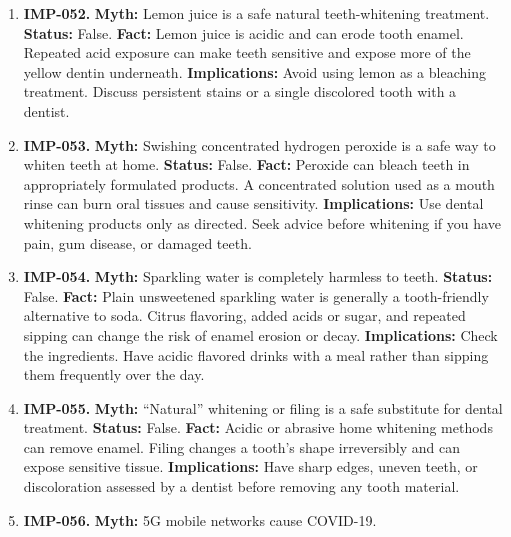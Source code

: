 \documentclass[11pt,oneside]{book}
\begin{document}
\begin{enumerate}[leftmargin=0pt,labelwidth=0pt,labelsep=0pt,itemindent=0pt]
\item[] \textbf{IMP-052.} \textbf{Myth:} Lemon juice is a safe natural teeth-whitening treatment.\newline
\textbf{Status:} False.\newline
\textbf{Fact:} Lemon juice is acidic and can erode tooth enamel. Repeated acid exposure can make teeth sensitive and expose more of the yellow dentin underneath. \cite{ref411}\newline
\textbf{Implications:} Avoid using lemon as a bleaching treatment. Discuss persistent stains or a single discolored tooth with a dentist.
\item[] \textbf{IMP-053.} \textbf{Myth:} Swishing concentrated hydrogen peroxide is a safe way to whiten teeth at home.\newline
\textbf{Status:} False.\newline
\textbf{Fact:} Peroxide can bleach teeth in appropriately formulated products. A concentrated solution used as a mouth rinse can burn oral tissues and cause sensitivity. \cite{ref411,ref50}\newline
\textbf{Implications:} Use dental whitening products only as directed. Seek advice before whitening if you have pain, gum disease, or damaged teeth.
\item[] \textbf{IMP-054.} \textbf{Myth:} Sparkling water is completely harmless to teeth.\newline
\textbf{Status:} False.\newline
\textbf{Fact:} Plain unsweetened sparkling water is generally a tooth-friendly alternative to soda. Citrus flavoring, added acids or sugar, and repeated sipping can change the risk of enamel erosion or decay. \cite{ref417}\newline
\textbf{Implications:} Check the ingredients. Have acidic flavored drinks with a meal rather than sipping them frequently over the day.
\item[] \textbf{IMP-055.} \textbf{Myth:} ``Natural'' whitening or filing is a safe substitute for dental treatment.\newline
\textbf{Status:} False.\newline
\textbf{Fact:} Acidic or abrasive home whitening methods can remove enamel. Filing changes a tooth's shape irreversibly and can expose sensitive tissue. \cite{ref411,ref50}\newline
\textbf{Implications:} Have sharp edges, uneven teeth, or discoloration assessed by a dentist before removing any tooth material.
\item[] \textbf{IMP-056.} \textbf{Myth:} 5G mobile networks cause COVID-19.\newline

\end{enumerate}
\end{document}
